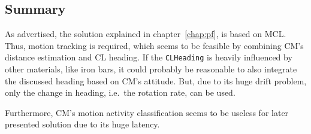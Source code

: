 \subsection{Summary}
As advertised, the solution explained in chapter~\ref{chap:pf}, is based on \ac{MCL}. Thus, motion tracking is required, which seems to be feasible by combining \ac{CM}'s distance estimation and \ac{CL} heading. If the \texttt{CLHeading} is heavily influenced by other materials, like iron bars, it could probably be reasonable to also integrate the discussed heading based on \ac{CM}'s attitude. But, due to its huge drift problem, only the change in heading, i.e.\ the rotation rate, can be used.

Furthermore, \ac{CM}'s motion activity classification seems to be useless for later presented solution due to its huge latency.
